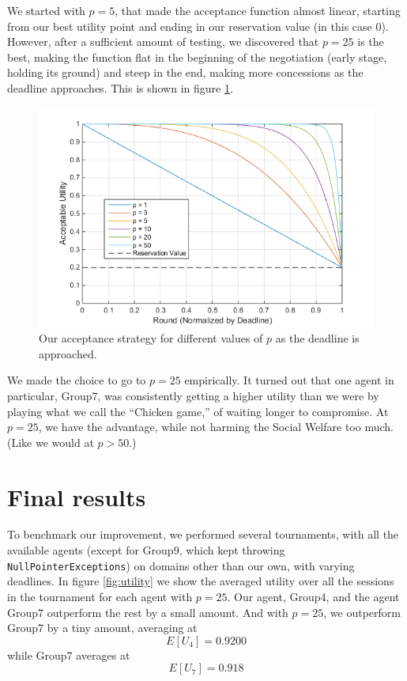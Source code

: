 \documentclass[a4,11pt]{scrartcl}
\begin{document}
We started with $p=5$, that made the acceptance function almost linear, starting from our best utility point and ending in our reservation value (in this case 0). However, after a sufficient amount of testing, we discovered that $p=25$ is the best, making the function flat in the beginning of the negotiation (early stage, holding its ground) and steep in the end, making more concessions as the deadline approaches. This is shown in figure \ref{fig:chicken}.
\label{sec:improvements}
\begin{figure}[ht]
    \centering
    \includegraphics[width=\textwidth]{chicken.png}
    \caption{Our acceptance strategy for different values of $p$ as the deadline is approached.}
    \label{fig:chicken}
\end{figure}

We made the choice to go to $p=25$ empirically. It turned out that one agent in particular, Group7, was consistently getting a higher utility than we were by playing what we call the ``Chicken game,'' of waiting longer to compromise. At $p=25$, we have the advantage, while not harming the Social Welfare too much. (Like we would at $p>50$.)


\section{Final results}

To benchmark our improvement, we performed several tournaments, with all the available agents (except for Group9, which kept throwing \verb|NullPointerExceptions|) on domains other than our own, with varying deadlines. In figure \ref{fig:utility} we show the averaged utility over all the sessions in the tournament for each agent with $p=25$. Our agent, Group4, and the agent Group7 outperform the rest by a small amount. And with $p=25$, we outperform Group7 by a tiny amount, averaging at $$E[U_{4}]=0.9200$$ while Group7 averages at $$E[U_{7}]=0.918$$
\end{document}

